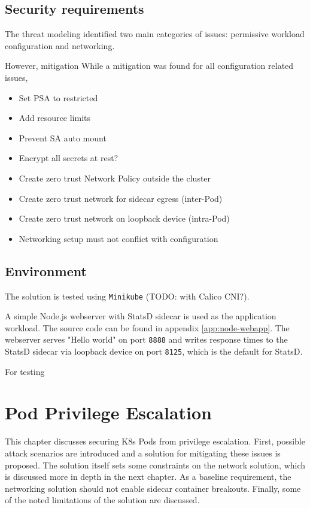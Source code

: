 \documentclass[english, 12pt, a4paper, sci, utf8, a-2b, online]{aaltothesis}
\begin{document}
\subsection{Security requirements}

The threat modeling identified two main categories of issues: permissive workload configuration and networking.


However, mitigation
While a mitigation was found for all configuration related issues,

\begin{itemize}
  \item Set PSA to restricted
  \item Add resource limits
  \item Prevent SA auto mount
  \item Encrypt all secrets at rest?
  \item Create zero trust Network Policy outside the cluster
  \item Create zero trust network for sidecar egress (inter-Pod)
  \item Create zero trust network on loopback device (intra-Pod)
  \item Networking setup must not conflict with configuration
\end{itemize}

\subsection{Environment}

The solution is tested using \texttt{Minikube} (TODO: with Calico CNI?).

A simple Node.js webserver with StatsD sidecar is used as the application workload. The source code can be found in appendix \ref{app:node-webapp}. The webserver serves "Hello world" on port \texttt{8888} and writes response times to the StatsD sidecar via loopback device on port \texttt{8125}, which is the default for StatsD.

For testing

\clearpage

\section{Pod Privilege Escalation}

This chapter discusses securing K8s Pods from privilege escalation. First, possible attack scenarios are introduced and a solution for mitigating these issues is proposed. The solution itself sets some constraints on the network solution, which is discussed more in depth in the next chapter. As a baseline requirement, the networking solution should not enable sidecar container breakouts. Finally, some of the noted limitations of the solution are discussed.
\end{document}
